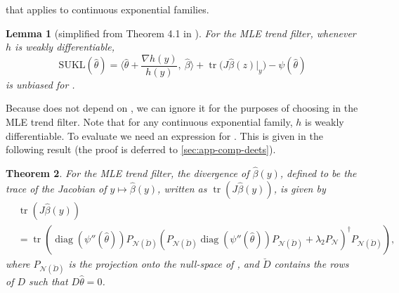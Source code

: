 \documentclass[ejs,noshowframe]{imsart}
\theoremstyle{plain}
\newtheorem{theorem}{Theorem}[section]
\newtheorem{lemma}[theorem]{Lemma}
\theoremstyle{definition}
\newcommand{\E}{E}
\newcommand{\cN}{\mathcal{N}}
\renewcommand{\hat}{\widehat}
\renewcommand{\top}{\mathsf{T}}
\DeclareMathOperator*{\trace}{tr}
\DeclareMathOperator*{\diag}{diag}
\newcommand{\Pnd}{P_{\cN(\breve{D})}}
\begin{document}
\citet{Deledalle2017} that applies to continuous exponential families.
\begin{lemma}[simplified from Theorem 4.1 in \citealt{Deledalle2017}]
	\label{lem:sukls}
	For the MLE trend filter, whenever $h$ is weakly differentiable,
	\begin{equation}
		\mathrm{SUKL}(\hat\theta) = \Big\langle \hat\theta + \frac{\nabla 
			h(y)}{h(y)},\
		\hat\beta\Big\rangle + \trace\Big( J\hat\beta(z)
		\big\vert_y\Big)
		- \psi(\hat\theta)
	\end{equation}
	is unbiased for \smash{$\E [\mathrm{KL}(\hat\theta(Y)\ \Vert\ \theta^*)] - 
	\psi(\theta^*)$}.
\end{lemma}
Because \smash{$\psi(\theta^*)$} does not depend on \smash{$\hat\theta$}, we 
can ignore it for the
purposes of choosing  in the MLE trend filter.
Note that for any continuous exponential family, $h$ is weakly differentiable.
To evaluate \smash{$\mathrm{SUKL}(\hat\theta)$} we need an expression for 
\smash{$J\hat\beta(y)$}.
This is given in the following result (the proof is deferred to
\autoref{sec:app-comp-deets}). 
\begin{theorem}
	\label{thm:simple-divergence}
	For the MLE trend filter, the
	divergence of $\hat\beta(y)$, defined to be the trace of the Jacobian of
	$y\mapsto \hat\beta(y)$, written as $\trace\left( J \hat\beta(y) \right)$,
	is given by 
	\begin{align}
		&\trace\left(J \hat\beta(y)\right) \nonumber\\
    & = \trace\left(
		\diag\left( \psi''(\hat\theta) \right)\Pnd
		\left(\Pnd\diag\left(\psi''(\hat\theta)\right) \Pnd
		+ \lambda_2 P_\cN \right)^\dagger \Pnd\right),
    \label{eq:2}
	\end{align}
	where $\Pnd$
	is the projection onto the null-space of , and
  $\breve{D}$ contains the rows of $D$ such that  $D\hat\theta = 0$.
\end{theorem}
\end{document}
